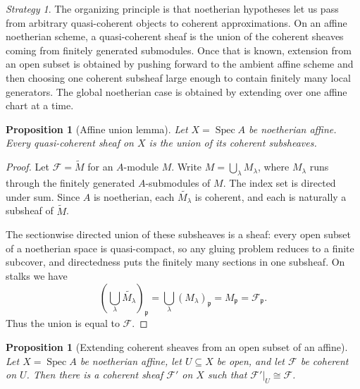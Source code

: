 \documentclass[11pt]{amsart}
\DeclareMathOperator{\Spec}{Spec}
\newcommand{\F}{\mathscr F}
\theoremstyle{plain}
\newtheorem{proposition}[theorem]{Proposition}
\theoremstyle{definition}
\theoremstyle{remark}
\newtheorem*{strategy}{Strategy}
\begin{document}
\begin{strategy}
The organizing principle is that noetherian hypotheses let us pass from arbitrary quasi-coherent objects to coherent approximations.  On an affine noetherian scheme, a quasi-coherent sheaf is the union of the coherent sheaves coming from finitely generated submodules.  Once that is known, extension from an open subset is obtained by pushing forward to the ambient affine scheme and then choosing one coherent subsheaf large enough to contain finitely many local generators.  The global noetherian case is obtained by extending over one affine chart at a time.
\end{strategy}

\begin{proposition}[Affine union lemma]\label{prop:affine-union}
Let $X=\Spec A$ be noetherian affine.  Every quasi-coherent sheaf on $X$ is the union of its coherent subsheaves.
\end{proposition}

\begin{proof}
Let $\F=\widetilde M$ for an $A$-module $M$.  Write $M=\bigcup_\lambda M_\lambda$, where $M_\lambda$ runs through the finitely generated $A$-submodules of $M$.  The index set is directed under sum.  Since $A$ is noetherian, each $\widetilde{M_\lambda}$ is coherent, and each is naturally a subsheaf of $\widetilde M$.

The sectionwise directed union of these subsheaves is a sheaf: every open subset of a noetherian space is quasi-compact, so any gluing problem reduces to a finite subcover, and directedness puts the finitely many sections in one subsheaf. On stalks we have
\[
  \left(\bigcup_\lambda \widetilde{M_\lambda}\right)_\mathfrak p
  = \bigcup_\lambda (M_\lambda)_\mathfrak p
  = M_\mathfrak p
  = \F_\mathfrak p.
\]
Thus the union is equal to $\F$.
\end{proof}

\begin{proposition}[Extending coherent sheaves from an open subset of an affine]\label{prop:affine-extension}
Let $X=\Spec A$ be noetherian affine, let $U\subseteq X$ be open, and let $\F$ be coherent on $U$.  Then there is a coherent sheaf $\F'$ on $X$ such that $\F'|_U\cong \F$.
\end{proposition}
\end{document}
